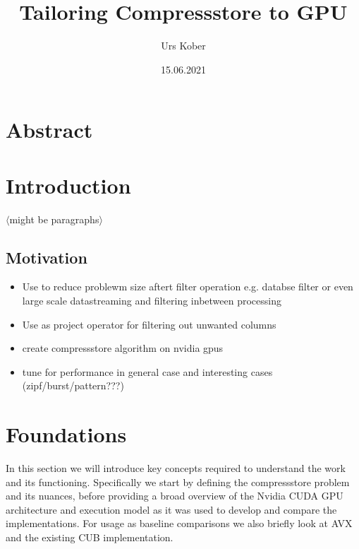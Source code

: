 \documentclass{tudscrreprt}
\newcommand{\markr}[1]{\textcolor{review}{$\langle$#1$\rangle$}}
\begin{document}
	
	\date{15.06.2021}
	\title{Tailoring Compressstore to GPU}
	 
	\author{ Urs Kober
		\matriculationnumber{---}
		\placeofbirth{---}
	}
	\maketitle
	
	\chapter*{Abstract}
	
	\chapter{Introduction}
	
		\markr{might be paragraphs}
		
		\section{Motivation}
		
			\begin{itemize}
				\item Use to reduce problewm size aftert filter operation
					\subitem e.g. databse filter
					\subitem or even large scale datastreaming and filtering inbetween processing
				\item Use as project operator for filtering out unwanted columns
				\item create compressstore algorithm on nvidia gpus
				\item tune for performance in general case and interesting cases (zipf/burst/pattern???)
			\end{itemize}
		
	\chapter{Foundations}
		In this section we will introduce key concepts required to understand the work and its functioning. Specifically we start by defining the compressstore problem and its nuances, before providing a broad overview of the Nvidia CUDA GPU architecture and execution model as it was used to develop and compare the implementations. For usage as baseline comparisons we also briefly look at AVX and the existing CUB implementation.
	
\end{document}
